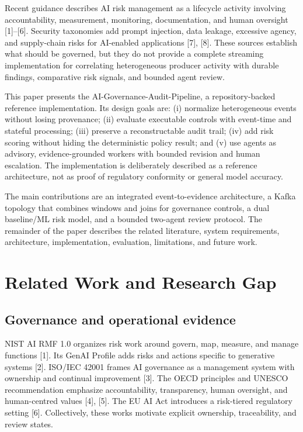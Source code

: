 \documentclass[conference]{IEEEtran}
\begin{document}
Recent guidance describes AI risk management as a lifecycle activity involving accountability, measurement, monitoring, documentation, and human oversight [1]--[6]. Security taxonomies add prompt injection, data leakage, excessive agency, and supply-chain risks for AI-enabled applications [7], [8]. These sources establish what should be governed, but they do not provide a complete streaming implementation for correlating heterogeneous producer activity with durable findings, comparative risk signals, and bounded agent review.

This paper presents the AI-Governance-Audit-Pipeline, a repository-backed reference implementation. Its design goals are: (i) normalize heterogeneous events without losing provenance; (ii) evaluate executable controls with event-time and stateful processing; (iii) preserve a reconstructable audit trail; (iv) add risk scoring without hiding the deterministic policy result; and (v) use agents as advisory, evidence-grounded workers with bounded revision and human escalation. The implementation is deliberately described as a reference architecture, not as proof of regulatory conformity or general model accuracy.

The main contributions are an integrated event-to-evidence architecture, a Kafka topology that combines windows and joins for governance controls, a dual baseline/ML risk model, and a bounded two-agent review protocol. The remainder of the paper describes the related literature, system requirements, architecture, implementation, evaluation, limitations, and future work.

\section{Related Work and Research Gap}
\subsection{Governance and operational evidence}
NIST AI RMF 1.0 organizes risk work around govern, map, measure, and manage functions [1]. Its GenAI Profile adds risks and actions specific to generative systems [2]. ISO/IEC 42001 frames AI governance as a management system with ownership and continual improvement [3]. The OECD principles and UNESCO recommendation emphasize accountability, transparency, human oversight, and human-centred values [4], [5]. The EU AI Act introduces a risk-tiered regulatory setting [6]. Collectively, these works motivate explicit ownership, traceability, and review states.
\end{document}
